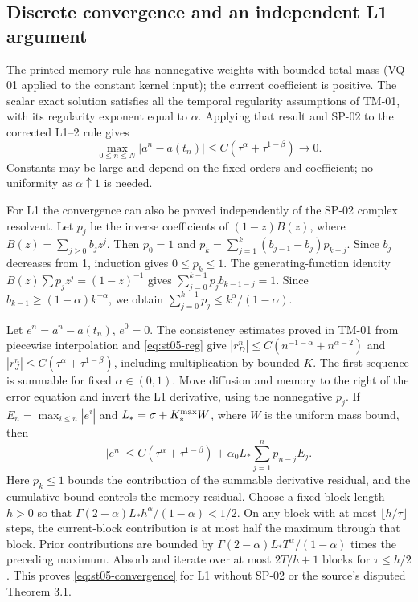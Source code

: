 \documentclass[11pt,a4paper]{amsart}
\theoremstyle{remark}
\theoremstyle{plain}
\theoremstyle{remark}
\numberwithin{equation}{section}
\begin{document}
\subsection{Discrete convergence and an independent L1 argument}
The printed memory rule has nonnegative weights with bounded total mass (VQ-01 applied to the constant kernel input); the current coefficient is positive. The scalar exact solution satisfies all the temporal regularity assumptions of TM-01, with its regularity exponent equal to $\alpha$. Applying that result and SP-02 to the corrected L1--2 rule gives
\begin{equation}\label{eq:st05-convergence}
 \max_{0\le n\le N}|a^n-a(t_n)|\le C\left(\tau^\alpha+\tau^{1-\beta}\right)\longrightarrow0.
\end{equation}
Constants may be large and depend on the fixed orders and coefficient; no uniformity as $\alpha\uparrow1$ is needed.

For L1 the convergence can also be proved independently of the SP-02 complex resolvent. Let $p_j$ be the inverse coefficients of $(1-z)B(z)$, where $B(z)=\sum_{j\ge0}b_jz^j$. Then $p_0=1$ and $p_k=\sum_{j=1}^k(b_{j-1}-b_j)p_{k-j}$. Since $b_j$ decreases from 1, induction gives $0\le p_k\le1$. The generating-function identity $B(z)\sum p_jz^j=(1-z)^{-1}$ gives $\sum_{j=0}^{k-1}p_j b_{k-1-j}=1$. Since $b_{k-1}\ge(1-\alpha)k^{-\alpha}$, we obtain $\sum_{j=0}^{k-1}p_j\le k^\alpha/(1-\alpha)$.

Let $e^n=a^n-a(t_n)$, $e^0=0$. The consistency estimates proved in TM-01 from piecewise interpolation and \eqref{eq:st05-reg} give $|r_D^n|\le C(n^{-1-\alpha}+n^{\alpha-2})$ and $|r_J^n|\le C(\tau^\alpha+\tau^{1-\beta})$, including multiplication by bounded $K$. The first sequence is summable for fixed $\alpha\in(0,1)$. Move diffusion and memory to the right of the error equation and invert the L1 derivative, using the nonnegative $p_j$. If $E_n=\max_{i\le n}|e^i|$ and $L_*=\sigma+K_*^{\rm max}W$, where $W$ is the uniform mass bound, then
\[
 |e^n|\le C(\tau^\alpha+\tau^{1-\beta})+\alpha_0 L_*\sum_{j=1}^np_{n-j} E_j.
\]
Here $p_k\le1$ bounds the contribution of the summable derivative residual, and the cumulative bound controls the memory residual. Choose a fixed block length $h>0$ so that $\Gamma(2-\alpha)L_* h^\alpha/(1-\alpha)<1/2$. On any block with at most $\lfloor h/\tau\rfloor$ steps, the current-block contribution is at most half the maximum through that block. Prior contributions are bounded by $\Gamma(2-\alpha)L_*T^\alpha/(1-\alpha)$ times the preceding maximum. Absorb and iterate over at most $2T/h+1$ blocks for $\tau\le h/2$. This proves \eqref{eq:st05-convergence} for L1 without SP-02 or the source's disputed Theorem 3.1.
\end{document}
